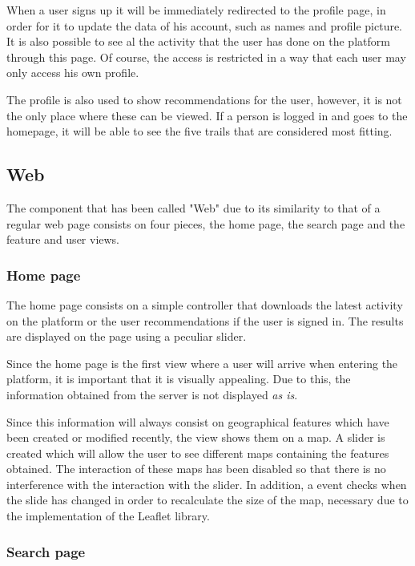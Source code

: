 When a user signs up it will be immediately redirected to the profile page, in order for it to update the data of his account, such as names and profile picture. It is also possible to see al the activity that the user has done on the platform through this page. Of course, the access is restricted in a way that each user may only access his own profile.

The profile is also used to show recommendations for the user, however, it is not the only place where these can be viewed. If a person is logged in and goes to the homepage, it will be able to see the five trails that are considered most fitting.

\subsection{Web}

The component that has been called "Web" due to its similarity to that of a regular web page consists on four pieces, the home page, the search page and the feature and user views.

\subsubsection*{Home page}

The home page consists on a simple controller that downloads the latest activity on the platform or the user recommendations if the user is signed in. The results are displayed on the page using a peculiar slider.

Since the home page is the first view where a user will arrive when entering the platform, it is important that it is visually appealing. Due to this, the information obtained from the server is not displayed \textit{as is}. 

Since this information will always consist on geographical features which have been created or modified recently, the view shows them on a map. A slider is created which will allow the user to see different maps containing the features obtained. The interaction of these maps has been disabled so that there is no interference with the interaction with the slider. In addition, a event checks when the slide has changed in order to recalculate the size of the map, necessary due to the implementation of the Leaflet library.

\subsubsection*{Search page}

